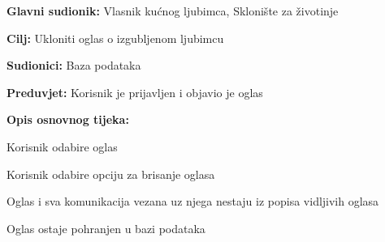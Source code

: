 \pagebreak
\noindent {}
\begin{packed_item}

	\item \textbf{Glavni sudionik: }Vlasnik kućnog ljubimca, Sklonište za životinje
	\item  \textbf{Cilj:} Ukloniti oglas o izgubljenom ljubimcu
	\item  \textbf{Sudionici:} Baza podataka
	\item  \textbf{Preduvjet:} Korisnik je prijavljen i objavio je oglas
	\item  \textbf{Opis osnovnog tijeka:}

	\item[] \begin{packed_enum}

		\item Korisnik odabire oglas
		\item Korisnik odabire opciju za brisanje oglasa
		\item Oglas i sva komunikacija vezana uz njega nestaju iz popisa vidljivih oglasa
		\item Oglas ostaje pohranjen u bazi podataka
	\end{packed_enum}

\end{packed_item}

